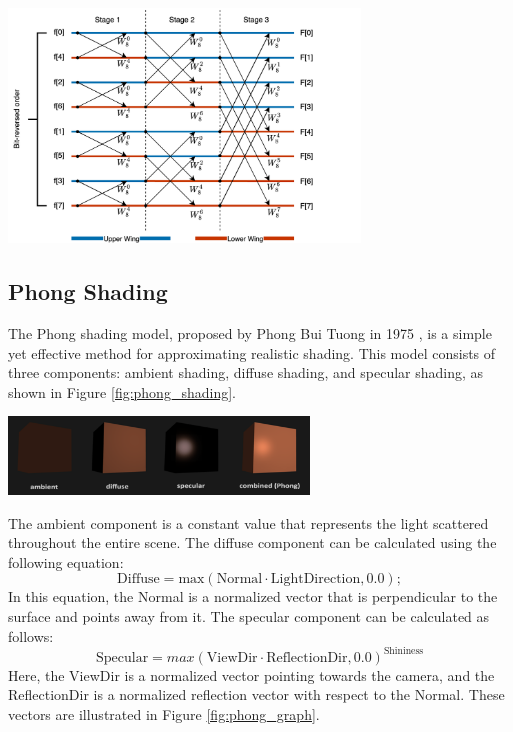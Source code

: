 \begin{minipage}{1\textwidth}
    \centering
    \includegraphics[width=0.7\textwidth]{"images/8_butterfly_diagram.png"}
    \label{fig:8_butterfly_diagram}
\end{minipage}

\subsection{Phong Shading}
The Phong shading model, proposed by Phong Bui Tuong in 1975 \cite{phong1975}, is a simple yet effective method for approximating realistic shading. This model consists of three components: ambient shading, diffuse shading, and specular shading, as shown in Figure \ref{fig:phong_shading}.

\begin{minipage}{1\textwidth}
    \centering
    \includegraphics[width=0.6\textwidth]{"images/phong_shading.png"}
    \label{fig:phong_shading}
\end{minipage}

The ambient component is a constant value that represents the light scattered throughout the entire scene. The diffuse component can be calculated using the following equation:
\begin{equation}
    \text{Diffuse} = \text{max}(\text{Normal} \cdot \text{LightDirection}, 0.0);
\end{equation}
In this equation, the Normal is a normalized vector that is perpendicular to the surface and points away from it. The specular component can be calculated as follows:
\begin{equation}
    \text{Specular} = max(\text{ViewDir} \cdot \text{ReflectionDir}, 0.0)^{\text{Shininess}}
    \label{eq:phong_specular}
\end{equation}
Here, the ViewDir is a normalized vector pointing towards the camera, and the ReflectionDir is a normalized reflection vector with respect to the Normal. These vectors are illustrated in Figure \ref{fig:phong_graph}.

